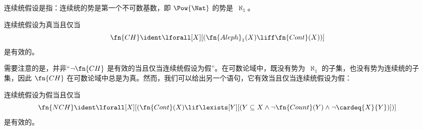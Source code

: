 \documentclass[../../../include/open-logic-section]{subfiles}
\begin{document}
\begin{explain}
连续统假设是指：连续统的势是第一个不可数基数，即 $\Pow{\Nat}$ 的势是~$\aleph_1$。
\end{explain}

\begin{prop}
连续统假设为真当且仅当 \[\fn{CH} \ident
\lforall[X][(\fn{Aleph}_1(X) \liff \fn{Cont}(X))]\] 是有效的。
\end{prop}

需要注意的是，并非“$\lnot \fn{CH}$ 是有效的当且仅当连续统假设为假”。在可数论域中，既没有势为~$\aleph_1$ 的子集，也没有势为连续统的子集，因此 $\fn{CH}$ 在可数论域中总是为真。然而，我们可以给出另一个语句，它有效当且仅当连续统假设为假：

\begin{prop}
连续统假设为假当且仅当 \[\fn{NCH} \ident
\lforall[X][(\fn{Cont}(X) \lif \lexists[Y][(Y \subseteq X \land \lnot
    \fn{Count}(Y) \land \lnot \cardeq{X}{Y})])]\] 是有效的。
\end{prop}
\end{document}
